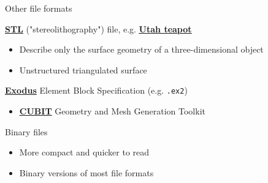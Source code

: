 \documentclass{beamer}
\begin{document}
\begin{frame}{Other file formats}
    
    \href{https://en.wikipedia.org/wiki/STL_(file_format)}{\bf\underline{STL}} ("stereolithography") file, e.g. \href{https://commons.wikimedia.org/wiki/File:Utah_teapot_(solid).stl}{\bf\underline{Utah teapot}}
    \begin{itemize}
        \item Describe only the surface geometry of a three-dimensional object
        \item Unstructured triangulated surface
    \end{itemize}{}
    
    \vskip 6pt
    
    \href{https://cubit.sandia.gov/public/13.2/help_manual/WebHelp/finite_element_model/exodus/block_specification.htm}{\bf\underline{Exodus}} Element Block Specification (e.g. \texttt{.ex2})
    \begin{itemize}
        \item \href{https://cubit.sandia.gov/}{\bf\underline{CUBIT}} Geometry and Mesh Generation Toolkit
    \end{itemize}{}
    
    \vskip 6pt
    
    Binary files
    \begin{itemize}
        \item More compact and quicker to read
        \item Binary versions of most file formats
    \end{itemize}{}
    
\end{frame}{}
\end{document}
